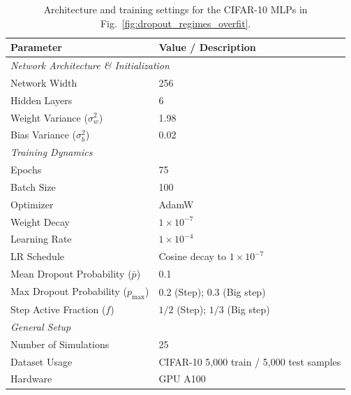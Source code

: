 \begin{table}[h]
 \caption{Architecture and training settings for the CIFAR-10 MLPs in Fig.~\ref{fig:dropout_regimes_overfit}.}
 \label{tab:experiment_config_2}
 \centering
 \begin{tabular}{l l}
 \toprule
 \textbf{Parameter} & \textbf{Value / Description} \\
 \midrule
 \multicolumn{2}{l}{\textit{Network Architecture \& Initialization}} \\
 \midrule
 Network Width & 256 \\
 Hidden Layers & 6 \\
 Weight Variance ($\sigma_w^2$) & 1.98 \\
 Bias Variance ($\sigma_b^2$) & 0.02 \\

 \midrule
 \multicolumn{2}{l}{\textit{Training Dynamics}} \\
 \midrule
 Epochs & 75 \\
 Batch Size & 100 \\
 Optimizer & AdamW \\
 Weight Decay & $1 \times 10^{-7}$ \\
 Learning Rate & $1 \times 10^{-4}$ \\
 LR Schedule & Cosine decay to $1 \times 10^{-7}$ \\
 Mean Dropout Probability ($\bar{p}$) & 0.1 \\
 Max Dropout Probability ($p_{\max}$) & 0.2 (Step); 0.3 (Big step) \\
 Step Active Fraction ($f$) & $1/2$ (Step); $1/3$ (Big step) \\
 \midrule
 \multicolumn{2}{l}{\textit{General Setup}} \\
 \midrule
 Number of Simulations & 25 \\
 Dataset Usage & CIFAR-10 5,000 train / 5,000 test samples \\
 Hardware & GPU A100 \\
 \bottomrule
 \end{tabular}
\end{table}

\FloatBarrier

